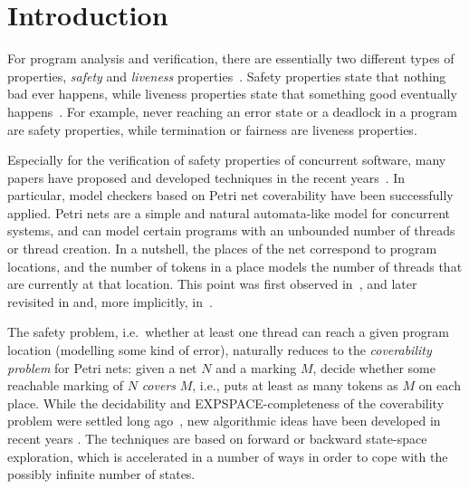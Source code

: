\chapter{Introduction}
\label{chap:introduction}

For program analysis and verification, there are essentially  two different
types of properties, \emph{safety} and \emph{liveness} properties~\cite{Lamport77}.
Safety properties state that nothing bad ever happens, while liveness properties
state that something good eventually happens~\cite{AlpernSchneider85}.
For example, never reaching an error state or a deadlock in a program are
safety properties, while termination or fairness are liveness properties.

Especially for the verification of safety properties of concurrent software, many
papers have proposed and developed techniques 
in the recent years~\cite{KaiserKW10,GantyM12,BouajjaniE14,KaiserKW12,DOsualdoKO13}.
In particular, model checkers based on Petri net coverability have been successfully applied.  
Petri nets are a simple and natural automata-like model for concurrent systems, and 
can model certain programs with an unbounded
number of threads or thread creation. In a nutshell, the places of the
net correspond to program locations, and the number of tokens in a place
models the number of threads that are currently at that location. This
point was first observed in~\cite{GermanS92}, and later revisited in
\cite{DelzannoRB02} and, more implicitly, in~\cite{KaiserKW10,GantyM12}.

The safety problem, i.e.\ whether at least one thread can reach a given program
location (modelling some kind of error), naturally reduces to the
\emph{coverability problem} for Petri nets: given a net $N$ and a marking
$M$, decide whether some reachable marking of $N$ \emph{covers} $M$,
i.e., puts at least as many tokens as $M$ on each place. While the
decidability and EXPSPACE-completeness of the coverability problem
were settled long ago~\cite{KarpM69,Rackoff78}, new algorithmic ideas
have been developed in recent years
\cite{GeeraertsRB06,GantyRB08,ValmariH14,KaiserKW12,KloosMNP13}.
The techniques are based on forward or backward state-space 
exploration, which is accelerated in a number of ways in order to cope 
with the possibly infinite number of states.

